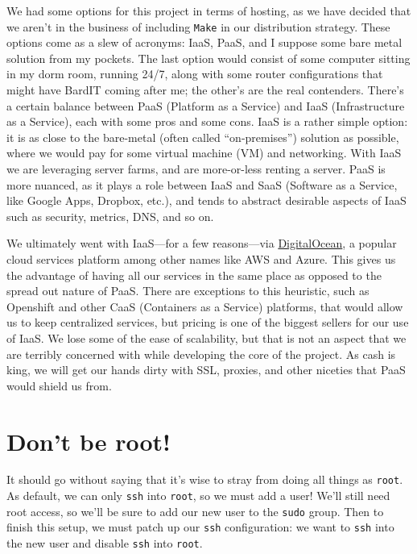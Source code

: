 \documentclass[11pt, twoside, reqno]{book}
\begin{document}
We had some options for this project in terms of hosting, as we have decided that we aren't in the business of including \texttt{Make} in our distribution strategy. These options come as a slew of acronyms: IaaS, PaaS, and I suppose some bare metal solution from my pockets. The last option would consist of some computer sitting in my dorm room, running 24/7, along with some router configurations that might have BardIT coming after me; the other's are the real contenders. There's a certain balance between PaaS (Platform as a Service) and IaaS (Infrastructure as a Service), each with some pros and some cons. IaaS is a rather simple option: it is as close to the bare-metal (often called ``on-premises'') solution as possible, where we would pay for some virtual machine (VM) and networking. With IaaS we are leveraging server farms, and are more-or-less renting a server. PaaS is more nuanced, as it plays a role between IaaS and SaaS (Software as a Service, like Google Apps, Dropbox, etc.), and tends to abstract desirable aspects of IaaS such as security, metrics, DNS, and so on.

We ultimately went with IaaS—for a few reasons—via \href{https://www.digitalocean.com}{DigitalOcean}, a popular cloud services platform among other names like AWS and Azure. This gives us the advantage of having all our services in the same place as opposed to the spread out nature of PaaS. There are exceptions to this heuristic, such as Openshift and other CaaS (Containers as a Service) platforms, that would allow us to keep centralized services, but pricing is one of the biggest sellers for our use of IaaS. We lose some of the ease of scalability, but that is not an aspect that we are terribly concerned with while developing the core of the project. As cash is king, we will get our hands dirty with SSL, proxies, and other niceties that PaaS would shield us from.

\section{Don't be root!}

It should go without saying that it's wise to stray from doing all things as \texttt{root}. As default, we can only \texttt{ssh} into \texttt{root}, so we must add a user! We'll still need root access, so we'll be sure to add our new user to the \texttt{sudo} group. Then to finish this setup, we must patch up our \texttt{ssh} configuration: we want to \texttt{ssh} into the new user and disable \texttt{ssh} into \texttt{root}.
\end{document}
